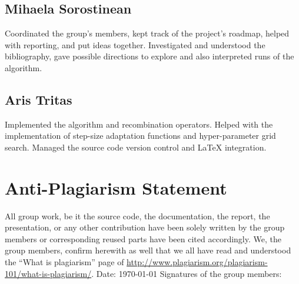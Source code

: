 \documentclass{article}
\begin{document}
\subsection*{Mihaela Sorostinean}
Coordinated the group's members, kept track of the project's roadmap, helped with reporting, and put ideas together. Investigated and understood the bibliography, gave possible directions to explore and also interpreted runs of the algorithm.

\subsection*{Aris Tritas}
Implemented the algorithm and recombination operators. Helped with the implementation of step-size adaptation functions and hyper-parameter grid search. Managed the source code version control and LaTeX integration.

\section*{Anti-Plagiarism Statement}
All group work, be it the source code, the documentation, the report, the presentation, or any other contribution have been solely written by the group members or corresponding reused parts have been cited accordingly. We, the group members, confirm herewith as well that we all have read and understood the ``What is plagiarism'' page of \url{http://www.plagiarism.org/plagiarism-101/what-is-plagiarism/}. \newline
Date: \today \newline
Signatures of the group members:
\end{document}
